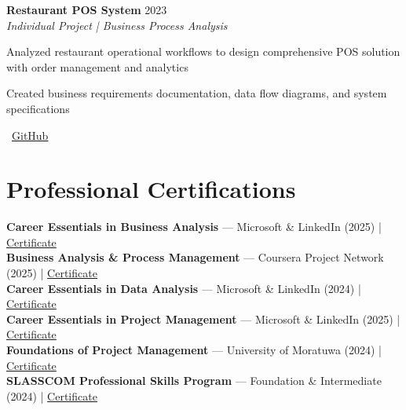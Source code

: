 \documentclass[letterpaper,10pt]{article}
\newenvironment{resume_list}{
  \vspace{-2pt}
  \begin{itemize}[itemsep=1pt, leftmargin=14pt]
}{
  \end{itemize}\vspace{-3pt}
}
\begin{document}
\textbf{Restaurant POS System} \hfill 2023\\
\textit{Individual Project | Business Process Analysis}\\
\begin{resume_list}
  \item Analyzed restaurant operational workflows to design comprehensive POS solution with order management and analytics
  \item Created business requirements documentation, data flow diagrams, and system specifications
  \item \faGithub~\href{https://github.com/vindyakodithuwakku02/pos-system.git}{GitHub}
\end{resume_list}

\section{Professional Certifications}
\vspace{-1pt}

\textbf{Career Essentials in Business Analysis} — Microsoft \& LinkedIn (2025) | \href{https://www.linkedin.com/posts/vindya-kodithuwakku-bb6187202_businessanalysis-careeressentials-microsoft-activity-7371193871919398914-PKak}{Certificate}\\
\textbf{Business Analysis \& Process Management} — Coursera Project Network (2025) | \href{https://coursera.org/verify/D5WHDN27811C}{Certificate}\\
\textbf{Career Essentials in Data Analysis} — Microsoft \& LinkedIn (2024) | \href{https://www.linkedin.com/posts/vindya-kodithuwakku-bb6187202_dataanalysis-careeressentials-microsoft-activity-7379124237950750720-kKmD}{Certificate}\\
\textbf{Career Essentials in Project Management} — Microsoft \& LinkedIn (2025) | \href{https://www.linkedin.com/posts/vindya-kodithuwakku-bb6187202_projectmanagement-careeressentials-microsoft-activity-7374470702059438080-zbfj}{Certificate}\\
\textbf{Foundations of Project Management} — University of Moratuwa (2024) | \href{https://open.uom.lk/lms/mod/customcert/verify_certificate.php?code=ATuxOYBBAE&qrcode=1}{Certificate}\\
\textbf{SLASSCOM Professional Skills Program} — Foundation \& Intermediate (2024) | \href{https://www.linkedin.com/posts/vindya-kodithuwakku-bb6187202_slasscom-professionalskillsprogram-careerdevelopment-activity-7379038487246860288-PRA0}{Certificate}
\end{document}
